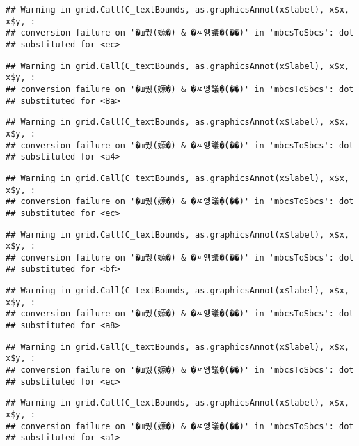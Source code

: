 \documentclass[
]{article}
\begin{document}
\begin{verbatim}
## Warning in grid.Call(C_textBounds, as.graphicsAnnot(x$label), x$x, x$y, :
## conversion failure on '�ш퀬(嫄�) & �ㅼ엥議�(��)' in 'mbcsToSbcs': dot
## substituted for <ec>
\end{verbatim}

\begin{verbatim}
## Warning in grid.Call(C_textBounds, as.graphicsAnnot(x$label), x$x, x$y, :
## conversion failure on '�ш퀬(嫄�) & �ㅼ엥議�(��)' in 'mbcsToSbcs': dot
## substituted for <8a>
\end{verbatim}

\begin{verbatim}
## Warning in grid.Call(C_textBounds, as.graphicsAnnot(x$label), x$x, x$y, :
## conversion failure on '�ш퀬(嫄�) & �ㅼ엥議�(��)' in 'mbcsToSbcs': dot
## substituted for <a4>
\end{verbatim}

\begin{verbatim}
## Warning in grid.Call(C_textBounds, as.graphicsAnnot(x$label), x$x, x$y, :
## conversion failure on '�ш퀬(嫄�) & �ㅼ엥議�(��)' in 'mbcsToSbcs': dot
## substituted for <ec>
\end{verbatim}

\begin{verbatim}
## Warning in grid.Call(C_textBounds, as.graphicsAnnot(x$label), x$x, x$y, :
## conversion failure on '�ш퀬(嫄�) & �ㅼ엥議�(��)' in 'mbcsToSbcs': dot
## substituted for <bf>
\end{verbatim}

\begin{verbatim}
## Warning in grid.Call(C_textBounds, as.graphicsAnnot(x$label), x$x, x$y, :
## conversion failure on '�ш퀬(嫄�) & �ㅼ엥議�(��)' in 'mbcsToSbcs': dot
## substituted for <a8>
\end{verbatim}

\begin{verbatim}
## Warning in grid.Call(C_textBounds, as.graphicsAnnot(x$label), x$x, x$y, :
## conversion failure on '�ш퀬(嫄�) & �ㅼ엥議�(��)' in 'mbcsToSbcs': dot
## substituted for <ec>
\end{verbatim}

\begin{verbatim}
## Warning in grid.Call(C_textBounds, as.graphicsAnnot(x$label), x$x, x$y, :
## conversion failure on '�ш퀬(嫄�) & �ㅼ엥議�(��)' in 'mbcsToSbcs': dot
## substituted for <a1>
\end{verbatim}
\end{document}
